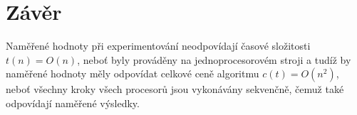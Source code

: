 \documentclass[12pt,a4paper,titlepage,final]{article}
\begin{document}
\section{Závěr}
Naměřené hodnoty při experimentování neodpovídají časové složitosti $t(n) = O(n)$, neboť byly prováděny na jednoprocesorovém stroji a tudíž by naměřené hodnoty měly 
odpovídat celkové ceně algoritmu $c(t) = O(n^2)$, neboť všechny kroky všech procesorů jsou vykonávány sekvenčně, čemuž také odpovídají naměřené výsledky.
\end{document}
